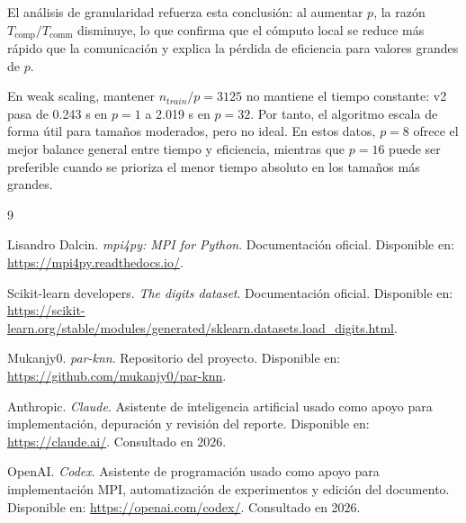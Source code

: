 \documentclass[11pt,a4paper]{article}
\begin{document}
El análisis de granularidad refuerza esta conclusión: al aumentar $p$, la razón
$T_{\text{comp}}/T_{\text{comm}}$ disminuye, lo que confirma que el cómputo local se reduce más
rápido que la comunicación y explica la pérdida de eficiencia para valores grandes de $p$.

En weak scaling, mantener $n_{train}/p=3125$ no mantiene el tiempo constante: v2 pasa de 0.243 s
en $p=1$ a 2.019 s en $p=32$. Por tanto, el algoritmo escala de forma útil para tamaños moderados,
pero no ideal. En estos datos, $p=8$ ofrece el mejor balance general entre tiempo y eficiencia,
mientras que $p=16$ puede ser preferible cuando se prioriza el menor tiempo absoluto en los tamaños
más grandes.

\begin{thebibliography}{9}

Lisandro Dalcin.
\textit{mpi4py: MPI for Python}.
Documentación oficial. Disponible en:
\href{https://mpi4py.readthedocs.io/}{https://mpi4py.readthedocs.io/}.

Scikit-learn developers.
\textit{The digits dataset}.
Documentación oficial. Disponible en:
\href{https://scikit-learn.org/stable/modules/generated/sklearn.datasets.load_digits.html}{https://scikit-learn.org/stable/modules/generated/sklearn.datasets.load\_digits.html}.

Mukanjy0.
\textit{par-knn}.
Repositorio del proyecto. Disponible en:
\href{https://github.com/mukanjy0/par-knn}{https://github.com/mukanjy0/par-knn}.

Anthropic.
\textit{Claude}.
Asistente de inteligencia artificial usado como apoyo para implementación, depuración y revisión
del reporte. Disponible en:
\href{https://claude.ai/}{https://claude.ai/}. Consultado en 2026.

OpenAI.
\textit{Codex}.
Asistente de programación usado como apoyo para implementación MPI, automatización de experimentos
y edición del documento. Disponible en:
\href{https://openai.com/codex/}{https://openai.com/codex/}. Consultado en 2026.

\end{thebibliography}
\end{document}
